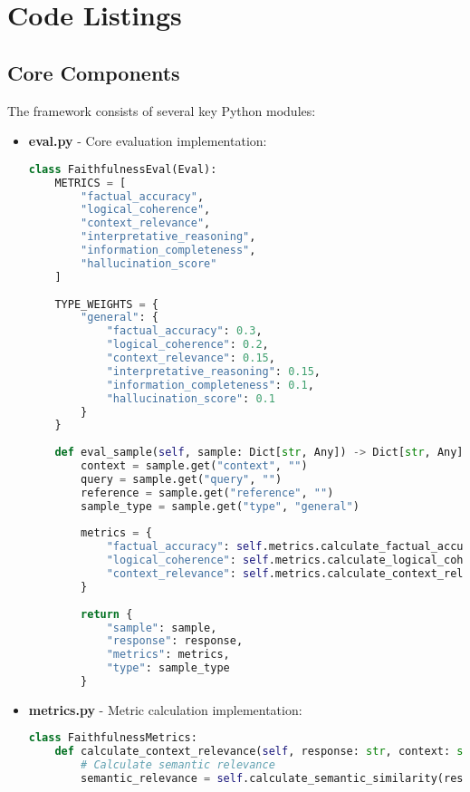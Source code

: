 \appendix
\section{Code Listings}

\subsection{Core Components}
The framework consists of several key Python modules:

\begin{itemize}
    \item \textbf{eval.py} - Core evaluation implementation:
    \begin{lstlisting}[language=Python, breaklines=true, basicstyle=\ttfamily\scriptsize]
class FaithfulnessEval(Eval):
    METRICS = [
        "factual_accuracy",
        "logical_coherence",
        "context_relevance",
        "interpretative_reasoning",
        "information_completeness",
        "hallucination_score"
    ]
    
    TYPE_WEIGHTS = {
        "general": {
            "factual_accuracy": 0.3,
            "logical_coherence": 0.2,
            "context_relevance": 0.15,
            "interpretative_reasoning": 0.15,
            "information_completeness": 0.1,
            "hallucination_score": 0.1
        }
    }
    
    def eval_sample(self, sample: Dict[str, Any]) -> Dict[str, Any]:
        context = sample.get("context", "")
        query = sample.get("query", "")
        reference = sample.get("reference", "")
        sample_type = sample.get("type", "general")
        
        metrics = {
            "factual_accuracy": self.metrics.calculate_factual_accuracy(response, reference),
            "logical_coherence": self.metrics.calculate_logical_coherence(response),
            "context_relevance": self.metrics.calculate_context_relevance(response, context)
        }
        
        return {
            "sample": sample,
            "response": response,
            "metrics": metrics,
            "type": sample_type
        }
    \end{lstlisting}

    \item \textbf{metrics.py} - Metric calculation implementation:
    \begin{lstlisting}[language=Python, breaklines=true, basicstyle=\ttfamily\scriptsize]
class FaithfulnessMetrics:
    def calculate_context_relevance(self, response: str, context: str) -> float:
        # Calculate semantic relevance
        semantic_relevance = self.calculate_semantic_similarity(response, context)
        

\end{lstlisting}
\end{itemize}
